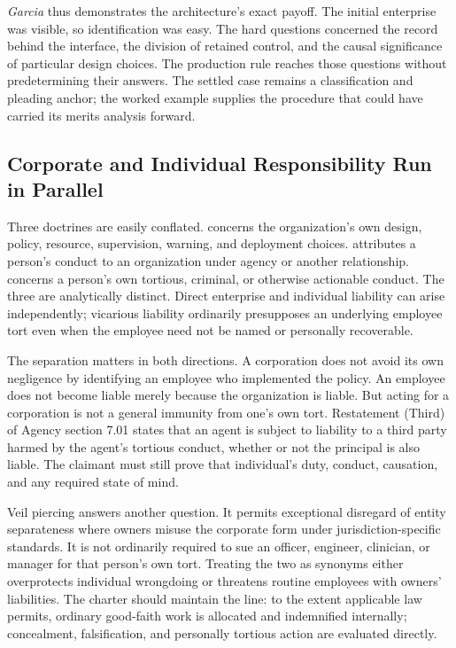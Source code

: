 \emph{Garcia} thus demonstrates the architecture's exact payoff. The initial enterprise was visible, so identification was easy. The hard questions concerned the record behind the interface, the division of retained control, and the causal significance of particular design choices. The production rule reaches those questions without predetermining their answers. The settled case remains a classification and pleading anchor; the worked example supplies the procedure that could have carried its merits analysis forward.

\subsection{Corporate and Individual Responsibility Run in Parallel}

Three doctrines are easily conflated.  concerns the organization's own design, policy, resource, supervision, warning, and deployment choices.  attributes a person's conduct to an organization under agency or another relationship.  concerns a person's own tortious, criminal, or otherwise actionable conduct. The three are analytically distinct. Direct enterprise and individual liability can arise independently; vicarious liability ordinarily presupposes an underlying employee tort even when the employee need not be named or personally recoverable.

The separation matters in both directions. A corporation does not avoid its own negligence by identifying an employee who implemented the policy. An employee does not become liable merely because the organization is liable. But acting for a corporation is not a general immunity from one's own tort. Restatement (Third) of Agency section 7.01 states that an agent is subject to liability to a third party harmed by the agent's tortious conduct, whether or not the principal is also liable. The claimant must still prove that individual's duty, conduct, causation, and any required state of mind.

Veil piercing answers another question. It permits exceptional disregard of entity separateness where owners misuse the corporate form under jurisdiction-specific standards. It is not ordinarily required to sue an officer, engineer, clinician, or manager for that person's own tort. Treating the two as synonyms either overprotects individual wrongdoing or threatens routine employees with owners' liabilities. The charter should maintain the line: to the extent applicable law permits, ordinary good-faith work is allocated and indemnified internally; concealment, falsification, and personally tortious action are evaluated directly.

